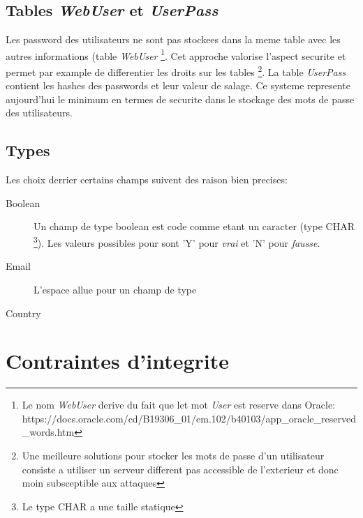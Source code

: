 \documentclass[twoside,openright,a4paper,11pt,french]{article}
\begin{document}
\subsection{Tables {\it WebUser} et {\it UserPass}}

Les password des utilisateurs ne sont pas stockees dans la meme table avec les
autres informations (table {\it WebUser}
\footnote{Le nom {\it WebUser} derive du fait que let mot {\it User} est reserve dans Oracle:
https://docs.oracle.com/cd/B19306\_01/em.102/b40103/app\_oracle\_reserved\_words.htm}.
Cet approche valorise l'aspect securite et permet par
example de differentier les droits sur les tables
\footnote{Une meilleure solutions pour stocker les mots de passe d'un
utilisateur consiste a utiliser un serveur different pas accessible de
l'exterieur et donc  moin subsceptible aux attaques}.
La table {\it UserPass} contient les hashes des passwords et leur valeur de
salage.  Ce systeme represente aujourd'hui le minimum en termes de securite
dans le stockage des mots de passe des utilisateurs.


\subsection{Types}
Les choix derrier certains champs suivent des raison bien precises:
\begin{description}
\item[Boolean] Un champ de type boolean est code comme etant un caracter (type CHAR
	\footnote{Le type CHAR a une taille statique}). Les valeurs possibles pour sont
	'Y' pour {\it vrai} et 'N' pour {\it fausse}.
\item[Email] L'espace allue pour un champ de type 
\item[Country] 
\end{description}


\section{Contraintes d'integrite}


\end{document}
